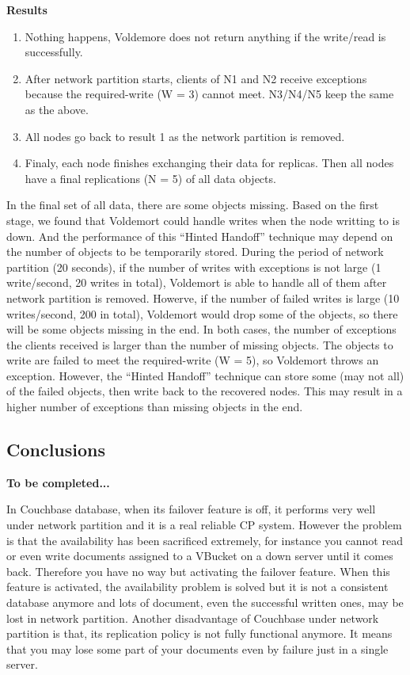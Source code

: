 \documentclass[a4paper]{article}
\begin{document}
{\bf Results}

\begin{enumerate}
  \item Nothing happens, Voldemore does not return anything if the write/read is successfully.
  \item After network partition starts, clients of N1 and N2 receive exceptions because the required-write (W = 3) cannot meet. N3/N4/N5 keep the same as the above. 
  \item All nodes go back to result 1 as the network partition is removed.
  \item Finaly, each node finishes exchanging their data for replicas. Then all nodes have a final replications (N = 5) of all data objects.
\end{enumerate}

In the final set of all data, there are some objects missing. Based on the first stage, we found that Voldemort could handle writes when the node writting to is down. 
And the performance of this ``Hinted Handoff'' technique may depend on the number of objects to be temporarily stored. During the period of network partition (20 seconds), 
if the number of writes with exceptions is not large (1 write/second, 20 writes in total), Voldemort is able to handle all of them after network partition is removed. 
Howerve, if the number of failed writes is large (10 writes/second, 200 in total), Voldemort would drop some of the objects, so there will be some objects missing in the end. 
In both cases, the number of exceptions the clients received is larger than the number of missing objects. The objects to write are failed to meet
the required-write (W = 5), so Voldemort throws an exception. However, the ``Hinted Handoff'' technique can store some (may not all) of the failed objects, then write back to
the recovered nodes. This may result in a higher number of exceptions than missing objects in the end.

\subsection{Conclusions}

{\bf To be completed...}

In Couchbase database, when its failover feature is off, it performs very well under network partition and it is a real reliable CP system.
However the problem is that the availability has been sacrificed extremely, for instance you cannot read or even write documents assigned to a VBucket on a down server until it comes back.
Therefore you have no way but activating the failover feature. 
When this feature is activated, the availability problem is solved but it is not a consistent database anymore and lots of document, even the successful written ones, may be lost in network partition. 
Another disadvantage of Couchbase under network partition is that, its replication policy is not fully functional anymore.
It means that you may lose some part of your documents even by failure just in a single server.
\end{document}
